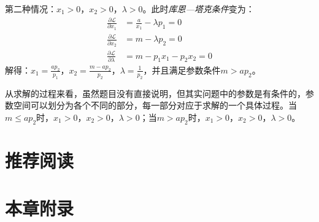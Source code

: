第二种情况：$x_1 > 0$，$x_2 > 0$，$\lambda > 0$。此时\emph{库恩—塔克条件}变为：
\begin{equation}
\begin{split}
\frac{\partial \mathcal{L}}{\partial x_1} &= \frac{a}{x_1} - \lambda p_1 = 0\\
\frac{\partial \mathcal{L}}{\partial x_2} &= m - \lambda p_2 = 0\\
\frac{\partial \mathcal{L}}{\partial \lambda} &= m - p_1 x_1 - p_2 x_2 = 0
\end{split}
\end{equation}
解得：$x_1 = \frac{ap_2}{p_1}$，$x_2 = \frac{m - ap_2}{p_2}$，$\lambda = \frac{1}{p_2}$，并且满足参数条件$m > ap_2$。

从求解的过程来看，虽然题目没有直接说明，但其实问题中的参数是有条件的，参数空间可以划分为各个不同的部分，每一部分对应于求解的一个具体过程。当$m \le ap_2$时，$x_1 > 0$，$x_2 > 0$，$\lambda > 0$；当$m > ap_2$时，$x_1 > 0$，$x_2 > 0$，$\lambda > 0$。

\section*{推荐阅读}

\newpage
\section*{本章附录}
\label{sec:appendix-utility-maximization-and-choice}
